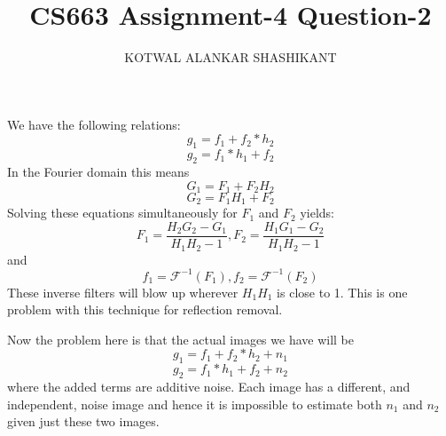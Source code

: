 \documentclass[10pt]{report}
\begin{document}
\title{CS663 Assignment-4 Question-2}
\author{KOTWAL ALANKAR SHASHIKANT}
\maketitle

We have the following relations:
$$g_1 = f_1 + f_2 * h_2$$
$$g_2 = f_1 * h_1 + f_2$$
In the Fourier domain this means
$$G_1 = F_1 + F_2 H_2$$
$$G_2 = F_1 H_1 + F_2$$
Solving these equations simultaneously for $F_1$ and $F_2$ yields:
$$F_1 = \frac{H_2 G_2 - G_1}{H_1 H_2 - 1}, F_2 = \frac{H_1 G_1 - G_2}{H_1 H_2 - 1}$$
and $$f_1 = \mathcal{F}^{-1}(F_1), f_2 = \mathcal{F}^{-1}(F_2)$$
These inverse filters will blow up wherever $H_1H_1$ is close to 1. This is one problem with this technique for reflection removal.

Now the problem here is that the actual images we have will be
$$g_1 = f_1 + f_2 * h_2 + n_1$$
$$g_2 = f_1 * h_1 + f_2 + n_2$$
where the added terms are additive noise. Each image has a different, and independent, noise image and hence it is impossible to estimate both $n_1$ and $n_2$ given just these two images.
\end{document}
